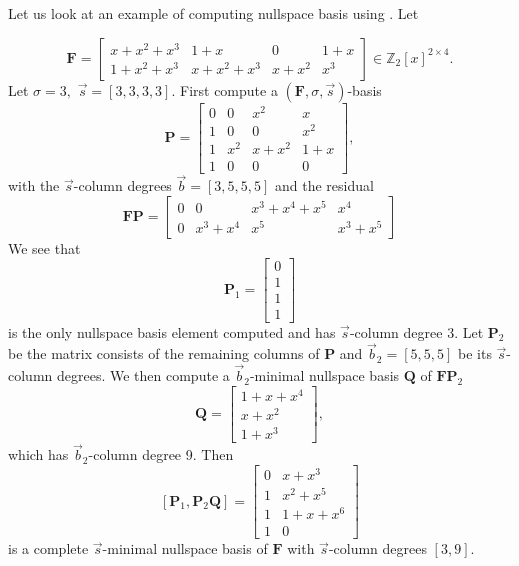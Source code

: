 \begin{exmp}
\label{exm:continueComputingNullspaceBasisByColumns}Let us look at
an example of computing nullspace basis using .
Let 

\[
\mathbf{F}=\left[\begin{array}{cccc}
x+x^{2}+x^{3} & 1+x & 0 & 1+x\\
1+x^{2}+x^{3} & x+x^{2}+x^{3} & x+x^{2} & x^{3}
\end{array}\right]\in\mathbb{Z}_{2}\left[x\right]^{2\times4}.
\]
Let $\sigma=3,$ $\vec{s}=\left[3,3,3,3\right]$. First compute a
$\left(\mathbf{F},\sigma,\vec{s}\right)$-basis 
\[
\mathbf{P}=\left[\begin{array}{cccc}
0 & 0 & x^{2} & x\\
1 & 0 & 0 & x^{2}\\
1 & x^{2} & x+x^{2} & 1+x\\
1 & 0 & 0 & 0
\end{array}\right],
\]
 with the $\vec{s}$-column degrees $\vec{b}=\left[3,5,5,5\right]$
and the residual 
\[
\mathbf{F}\mathbf{P}=\left[\begin{array}{cccc}
0 & 0 & x^{3}+x^{4}+x^{5} & x^{4}\\
0 & x^{3}+x^{4} & x^{5} & x^{3}+x^{5}
\end{array}\right]
\]
 We see that 
\[
\mathbf{P}_{1}=\begin{bmatrix}0\\
1\\
1\\
1
\end{bmatrix}
\]
 is the only nullspace basis element computed and has $\vec{s}$-column
degree $3$. Let $\mathbf{P}_{2}$ be the matrix consists of the remaining
columns of $\mathbf{P}$ and $\vec{b}_{2}=\left[5,5,5\right]$ be
its $\vec{s}$-column degrees. We then compute a $\vec{b}_{2}$-minimal
nullspace basis $\mathbf{Q}$ of $\mathbf{F}\mathbf{P}_{2}$ 
\[
\mathbf{Q}=\begin{bmatrix}1+x+x^{4}\\
x+x^{2}\\
1+x^{3}
\end{bmatrix},
\]
 which has $\vec{b}_{2}$-column degree 9. Then 
\[
\left[\mathbf{P}_{1},\mathbf{P}_{2}\mathbf{Q}\right]=\left[\begin{array}{cc}
0 & x+x^{3}\\
1 & x^{2}+x^{5}\\
1 & 1+x+x^{6}\\
1 & 0
\end{array}\right]
\]
 is a complete $\vec{s}$-minimal nullspace basis of $\mathbf{F}$
with $\vec{s}$-column degrees $\left[3,9\right]$. 
\end{exmp}
